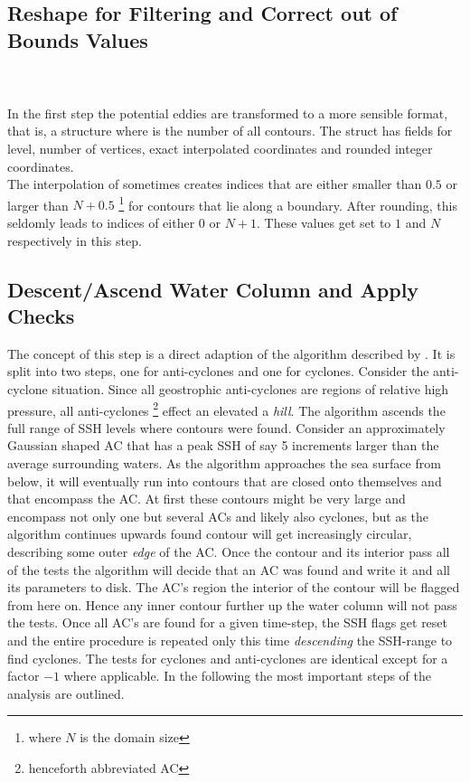 \subsection*{Reshape for Filtering and Correct out of Bounds Values}
\\
\\
In the first step the potential eddies are transformed to a more sensible
format, that is, a structure  where 
is the number of all contours. The struct has fields for level, number of
vertices, exact \ie interpolated coordinates and rounded integer coordinates.\\
The interpolation of  sometimes creates indices that are
either smaller than $0.5$ or larger than $N+0.5$ \footnote{where $N$ is the
domain size} for contours that lie along a boundary. After rounding, this
seldomly leads to indices of either $0$ or $N+1$. These values get set to $1$
and $N$ respectively in this step.
\subsection*{Descent/Ascend Water Column and Apply Checks}
The concept of this step is a direct adaption of the algorithm described
by \cite{Chelton2011}. It is split into two steps, one for anti-cyclones and one
for cyclones. Consider \eg the anti-cyclone situation. Since all
geostrophic anti-cyclones are regions of relative high pressure, all
anti-cyclones \footnote{henceforth abbreviated AC} effect an elevated \SSH \ie
a \textit{hill}. The algorithm ascends the full range of SSH levels where
contours were found. Consider an approximately Gaussian shaped AC that has a
peak SSH of say 5 increments larger than the average surrounding waters. 
As the algorithm approaches the sea surface from below, it will eventually run
into contours that are closed onto themselves and that encompass the AC. At
first these contours might be very large and encompass not only one but several
ACs and likely also cyclones, but as the algorithm continues upwards found
contour will get increasingly circular, describing some outer \textit{edge} of
the AC. Once the contour and its interior pass all of the tests the algorithm
will decide that an AC was found and write it and all its parameters to disk.
The AC's region \ie the interior of the contour will be flagged from here on.
Hence any inner contour further up the water column will not pass the tests.
Once all AC's are found for a given time-step, the SSH flags get reset and the
entire procedure is repeated only this time \textit{descending} the SSH-range to
find cyclones. The tests for cyclones and anti-cyclones are identical except for
a factor $-1$ where applicable. In the following the most important steps of the
analysis are
outlined. 
